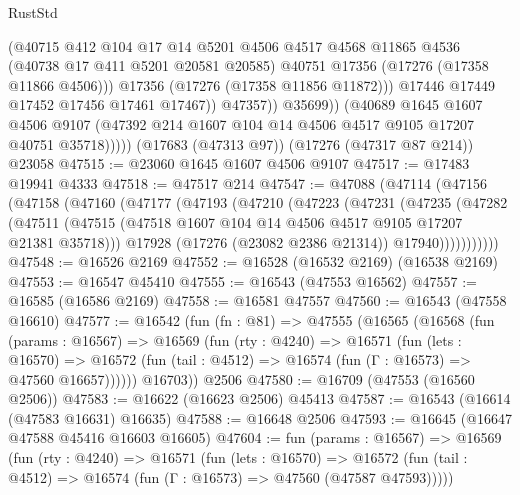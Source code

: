\begin{lexlean}{RustStd}
\begin{coremodule}
                        (@40715
                          @412
                          @104
                          @17
                          @14
                          @5201
                          @4506
                          @4517
                          @4568
                          @11865
                          @4536
                          (@40738 @17 @411 @5201 @20581 @20585)
                          @40751
                          @17356
                          (@17276 (@17358 @11866 @4506)))
                        @17356
                        (@17276 (@17358 @11856 @11872)))
                      @17446
                      @17449
                      @17452
                      @17456
                      @17461
                      @17467))
                  @47357))
              @35699))
          (@40689
            @1645
            @1607
            @4506
            @9107
            (@47392 @214 @1607 @104 @14 @4506 @4517 @9105 @17207 @40751 @35718)))))
    (@17683 (@47313 @97))
    (@17276 (@47317 @87 @214))
    @23058
@47515 := @23060 @1645 @1607 @4506 @9107
@47517 := @17483 @19941 @4333
@47518 := @47517 @214
@47547 := @47088
    (@47114
      (@47156
        (@47158
          (@47160
            (@47177
              (@47193
                (@47210
                  (@47223
                    (@47231
                      (@47235
                        (@47282
                          (@47511
                            (@47515 (@47518 @1607 @104 @14 @4506 @4517 @9105 @17207 @21381 @35718)))
                          @17928
                          (@17276 (@23082 @2386 @21314))
                          @17940)))))))))))
@47548 := @16526 @2169
@47552 := @16528 (@16532 @2169) (@16538 @2169)
@47553 := @16547 @45410
@47555 := @16543 (@47553 @16562)
@47557 := @16585 (@16586 @2169)
@47558 := @16581 @47557
@47560 := @16543 (@47558 @16610)
@47577 := @16542
    (fun (fn : @81) =>
    @47555
      (@16565
        (@16568
          (fun (params : @16567) =>
          @16569
            (fun (rty : @4240) =>
            @16571
              (fun (lets : @16570) =>
              @16572 (fun (tail : @4512) => @16574 (fun (Γ : @16573) => @47560 @16657))))))
        @16703))
    @2506
@47580 := @16709 (@47553 (@16560 @2506))
@47583 := @16622 (@16623 @2506) @45413
@47587 := @16543 (@16614 (@47583 @16631) @16635)
@47588 := @16648 @2506
@47593 := @16645 (@16647 @47588 @45416 @16603 @16605)
@47604 := fun (params : @16567) =>
  @16569
    (fun (rty : @4240) =>
    @16571
      (fun (lets : @16570) =>
      @16572 (fun (tail : @4512) => @16574 (fun (Γ : @16573) => @47560 (@47587 @47593)))))

\end{coremodule}
\end{lexlean}
